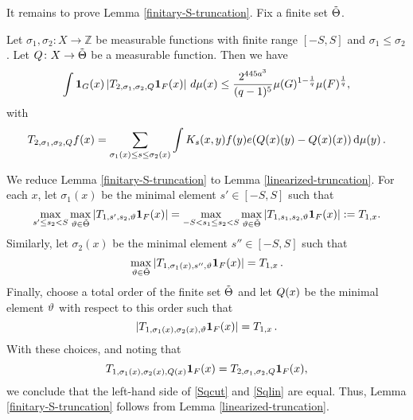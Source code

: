 It remains to prove Lemma \ref{finitary-S-truncation}.
Fix a finite set
$\tilde{{\Theta}}$.
\begin{lemma}
\label{linearized-truncation}
Let $\sigma_1,\sigma_2\colon X\to \mathbb{Z}$ be measurable functions with finite range
$[-S,S]$ and $\sigma_1\leq \sigma_2$.
Let ${Q}\colon X\to {\tilde{{\Theta}}}$ be a measurable function. Then we have
\begin{equation}  \label{Sqlin}
    \int \mathbf{1}_{G}(x)
    \left| {T}_{2,\sigma_1,\sigma_2,{Q}}\mathbf{1}_F(x)\right|\, d\mu(x)
    \le \frac{2^{445a^3}}{(q-1)^5} \mu(G)^{1-\frac{1}{q}} \mu(F)^{\frac{1}{q}},
\end{equation}
with
\begin{equation}\label{middles1}
    {T}_{2,\sigma_1,\sigma_2,{Q}}f(x)=\sum_{\sigma_1(x) \le s\le \sigma_2(x)}
    \int K_s(x,y)  f(y) e({Q}(x)(y) - {Q}(x)(x)) \, \mathrm{d}\mu(y)\,.
\end{equation}
\end{lemma}

We reduce Lemma \ref{finitary-S-truncation} to
Lemma \ref{linearized-truncation}.
For each $x$, let $\sigma_1(x)$ be the
minimal element $s'\in [-S,S]$ such that
\[\max_{s'\leq s_2<S}\max_{{\vartheta}\in\tilde{{\Theta}}}
| T_{1, s',s_2,{\vartheta}} \mathbf{1}_{F}(x)|
=
\max_{-S<s_1\le s_2<S}\max_{{\vartheta}\in\tilde{{\Theta}}}
| {T}_{1, s_1,s_2,{\vartheta}} \mathbf{1}_{F}(x)|:={T}_{1, x}.
\]
Similarly, let ${\sigma}_2(x)$ be the
minimal element $s''\in [-S,S]$ such that
\[\max_{{\vartheta}\in\tilde{{\Theta}}}
| {T}_{1, {\sigma}_1(x), s'',{\vartheta}} \mathbf{1}_{F}(x)|
=
{T}_{1,x}\,.
\]
Finally, choose a total order of the finite set $\tilde{{\Theta}}$
and let ${Q}(x)$ be the minimal element ${\vartheta}$ with respect to this order such that
\[
| {T}_{1, {\sigma}_1(x),{\sigma}_2(x),{\vartheta}} \mathbf{1}_{F}(x)| =  {T}_{1,x}\,.
\]
With these choices, and noting that
\begin{equation*}
{T}_{1, {\sigma}_1(x),{\sigma}_2(x),{Q}(x)} \mathbf{1}_{F}(x)={T}_{2, {\sigma}_1,{\sigma}_2,{Q}} \mathbf{1}_{F}(x),
\end{equation*}
we conclude that the left-hand side of \eqref{Sqcut}
and \eqref{Sqlin} are equal. Thus, Lemma \ref{finitary-S-truncation}
follows from Lemma \ref{linearized-truncation}.

